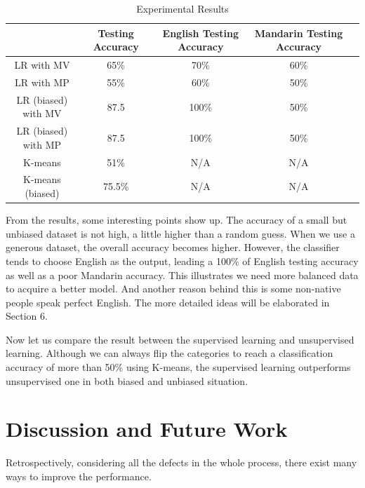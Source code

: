 \documentclass{sig-alternate}
\begin{document}
\begin{table}[ht]
\centering
\caption{Experimental Results}
\begin{tabular}{|c|c|c|c|c|} \hline
&Testing Accuracy&English Testing Accuracy&Mandarin Testing Accuracy \\ \hline
LR with MV & 65\% & 70\%  & 60\% \\ \hline
LR with MP & 55\% & 60\%  & 50\% \\ \hline
LR (biased) with MV&87.5 & 100\% & 50\%\\ \hline
LR (biased) with MP&87.5 & 100\% & 50\%\\ \hline
K-means & 51\% & N/A&N/A \\ \hline
K-means (biased)& 75.5\% & N/A&N/A \\ \hline
\end{tabular}
\end{table}

From the results, some interesting points show up. The accuracy of a small but unbiased dataset is not high, a little higher than a random guess. When we use a generous dataset, the overall accuracy becomes higher. However, the classifier tends to choose English as the output, leading a 100\% of English testing accuracy as well as a poor Mandarin accuracy. This illustrates we need more balanced data to acquire a better model. And another reason behind this is some non-native people speak perfect English. The more detailed ideas will be elaborated in Section 6.

Now let us compare the result between the supervised learning and unsupervised learning. Although we can always flip the categories to reach a classification accuracy of more than 50\% using K-means, the supervised learning outperforms unsupervised one in both biased and unbiased situation.


\section{Discussion and Future Work}


Retrospectively, considering all the defects in the whole process, there exist many ways to improve the performance.
\end{document}
